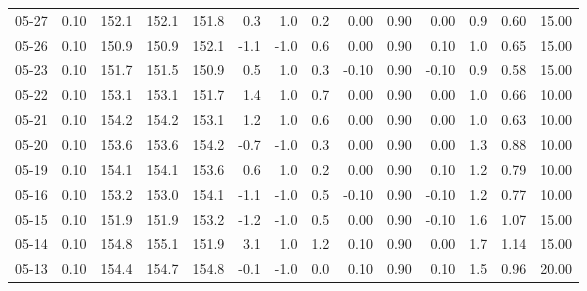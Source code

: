 \begin{threeparttable}
{\begin{tabular}{lrrrrrrrrrrrrr}
  05-27 &     0.10 & 152.1 & 152.1 & 151.8 &        0.3 &                      1.0 &                 0.2 &       0.00 &      0.90 &           0.00 &              0.9 &            0.60 &                  15.00 \\
  05-26 &     0.10 & 150.9 & 150.9 & 152.1 &       -1.1 &                     -1.0 &                 0.6 &       0.00 &      0.90 &           0.10 &              1.0 &            0.65 &                  15.00 \\
  05-23 &     0.10 & 151.7 & 151.5 & 150.9 &        0.5 &                      1.0 &                 0.3 &      -0.10 &      0.90 &          -0.10 &              0.9 &            0.58 &                  15.00 \\
  05-22 &     0.10 & 153.1 & 153.1 & 151.7 &        1.4 &                      1.0 &                 0.7 &       0.00 &      0.90 &           0.00 &              1.0 &            0.66 &                  10.00 \\
  05-21 &     0.10 & 154.2 & 154.2 & 153.1 &        1.2 &                      1.0 &                 0.6 &       0.00 &      0.90 &           0.00 &              1.0 &            0.63 &                  10.00 \\
  05-20 &     0.10 & 153.6 & 153.6 & 154.2 &       -0.7 &                     -1.0 &                 0.3 &       0.00 &      0.90 &           0.00 &              1.3 &            0.88 &                  10.00 \\
  05-19 &     0.10 & 154.1 & 154.1 & 153.6 &        0.6 &                      1.0 &                 0.2 &       0.00 &      0.90 &           0.10 &              1.2 &            0.79 &                  10.00 \\
  05-16 &     0.10 & 153.2 & 153.0 & 154.1 &       -1.1 &                     -1.0 &                 0.5 &      -0.10 &      0.90 &          -0.10 &              1.2 &            0.77 &                  10.00 \\
  05-15 &     0.10 & 151.9 & 151.9 & 153.2 &       -1.2 &                     -1.0 &                 0.5 &       0.00 &      0.90 &          -0.10 &              1.6 &            1.07 &                  15.00 \\
  05-14 &     0.10 & 154.8 & 155.1 & 151.9 &        3.1 &                      1.0 &                 1.2 &       0.10 &      0.90 &           0.00 &              1.7 &            1.14 &                  15.00 \\
  05-13 &     0.10 & 154.4 & 154.7 & 154.8 &       -0.1 &                     -1.0 &                 0.0 &       0.10 &      0.90 &           0.10 &              1.5 &            0.96 &                  20.00 \\

\end{tabular}}
\end{threeparttable}
